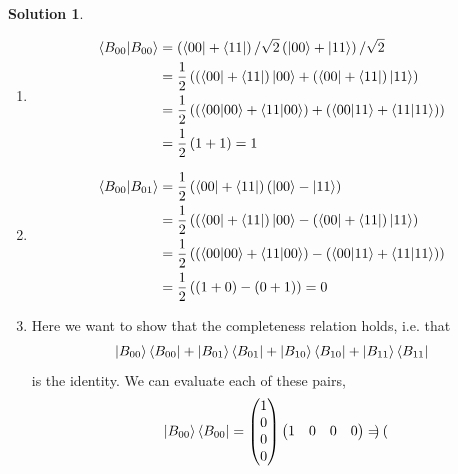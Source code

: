 \documentclass[10pt]{article}
\theoremstyle{definition}
\newtheorem{soln}{Solution}
\begin{document}
\begin{soln}
  \begin{enumerate}[label=(\alph*)]
    \item \begin{align*}
            \bra{B_{00}}\ket{B_{00}} & =\left(\bra{00}+\bra{11}\right)/\sqrt{2}\left(\ket{00}+\ket{11}\right)/\sqrt{2}                                        \\
                                     & =\frac{1}{2}\left(\left(\bra{00}+\bra{11}\right)\ket{00}+\left(\bra{00}+\bra{11}\right)\ket{11}\right)                 \\
                                     & =\frac{1}{2}\left(\left(\bra{00}\ket{00}+\bra{11}\ket{00}\right)+\left(\bra{00}\ket{11}+\bra{11}\ket{11}\right)\right) \\
                                     & =\frac{1}{2}\left(1+1\right)=1
          \end{align*}
    \item \begin{align*}
            \bra{B_{00}}\ket{B_{01}} & =\frac{1}{2}\left(\bra{00}+\bra{11}\right)\left(\ket{00}-\ket{11}\right)                                               \\
                                     & =\frac{1}{2}\left(\left(\bra{00}+\bra{11}\right)\ket{00}-\left(\bra{00}+\bra{11}\right)\ket{11}\right)                 \\
                                     & =\frac{1}{2}\left(\left(\bra{00}\ket{00}+\bra{11}\ket{00}\right)-\left(\bra{00}\ket{11}+\bra{11}\ket{11}\right)\right) \\
                                     & =\frac{1}{2}\left(\left(1+0\right)-\left(0+1\right)\right)=0
          \end{align*}
    \item Here we want to show that the completeness relation holds, i.e. that
          $$\ket{B_{00}}\bra{B_{00}}+\ket{B_{01}}\bra{B_{01}}+\ket{B_{10}}\bra{B_{10}}+\ket{B_{11}}\bra{B_{11}}$$
          is the identity. We can evaluate each of these pairs,
          $$\ket{B_{00}}\bra{B_{00}}=\begin{pmatrix}
              1 \\0\\0\\0
            \end{pmatrix}\begin{pmatrix}
              1 & 0 & 0 & 0
            \end{pmatrix}=\begin{pmatrix}

\end{pmatrix}$$
\end{enumerate}
\end{soln}
\end{document}
